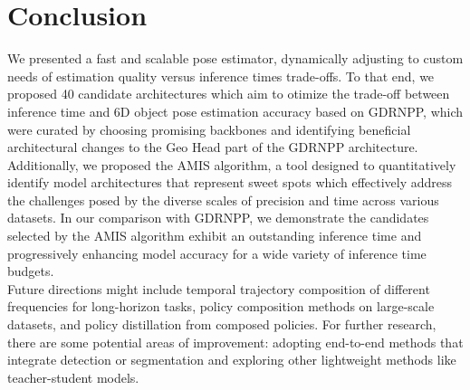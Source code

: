 \section{Conclusion}
We presented a fast and scalable pose estimator, dynamically adjusting to custom needs of estimation quality versus inference times trade-offs.
To that end, we proposed 40 candidate architectures which aim to otimize the trade-off between inference time and 6D object pose estimation accuracy based on GDRNPP, which were curated by choosing promising backbones and identifying beneficial architectural changes to the Geo Head part of the GDRNPP architecture.
Additionally, we proposed the AMIS algorithm, a tool designed to quantitatively identify model architectures that represent sweet spots which effectively address the challenges posed by the diverse scales of precision and time across various datasets. 
In our comparison with GDRNPP, we demonstrate the candidates selected by the AMIS algorithm exhibit an outstanding inference time and progressively enhancing model accuracy for a wide variety of inference time budgets.\\
Future directions might include temporal trajectory composition of different frequencies for long-horizon tasks, policy composition methods on large-scale datasets, and policy distillation from composed policies.
For further research, there are some potential areas of improvement: adopting end-to-end methods that integrate detection or segmentation and exploring other lightweight methods like teacher-student models.